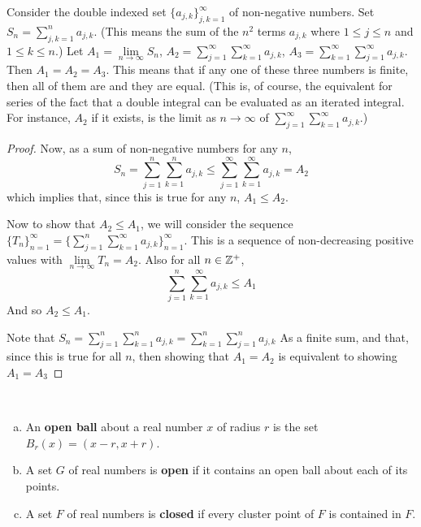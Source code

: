 \begin{pblm}%
	Consider the double indexed set $\{a_{j,k}\}_{j,k=1}^\infty$ of non-negative 
	numbers. Set $S_n = \sum\limits_{j,k=1}^na_{j,k}$. (This means the sum of the 
	$n^2$ terms $a_{j,k}$ where $1 \le j \le n$ and $1 \le k \le n$.) Let 
	$A_1 = \lim\limits_{n\to\infty}S_n$, 
	$A_2 = \sum\limits_{j=1}^\infty \sum\limits_{k=1}^\infty a_{j,k}$, 
	$A_3 = \sum\limits_{k=1}^\infty \sum\limits_{j=1}^\infty a_{j,k}$. 
	Then $A_1=A_2=A_3$. This means that if any 
	one of these three numbers is finite, then all of them are and they are 
	equal. (This is, of course, the equivalent for series of the fact that a 
	double integral can be evaluated as an iterated integral. For instance, $A_2$ 
	if it exists, is the limit as $n \to \infty$ of 
	$\sum\limits_{j=1}^\infty\sum\limits_{k=1}^\infty a_{j,k}$.)
\begin{proof}
	Now, as a sum of non-negative numbers for any $n$,
	\begin{equation*}
		S_n = \sum\limits_{j=1}^n\sum\limits_{k=1}^na_{j,k}\le
		\sum\limits_{j=1}^\infty\sum\limits_{k=1}^\infty a_{j,k}=A_2
	\end{equation*}
	which implies that, since this is true for any $n$, $A_1 \le A_2$. 

	Now to show that $A_2 \le A_1$, we will consider the sequence 
	$\{T_n\}_{n=1}^\infty = \{\sum\limits_{j=1}^n\sum\limits_{k=1}^\infty a_{j,k}\}_{n=1}^\infty$. This is a 
	sequence of non-decreasing positive values with $\lim\limits_{n\to\infty}T_n = A_2$. 
	Also for all $n \in \mathbb{Z}^+$, 
	\begin{equation*}
		\sum\limits_{j=1}^n\sum\limits_{k=1}^\infty a_{j,k} \le A_1
	\end{equation*}
	And so $A_2 \le A_1$. 

	Note that $S_n = \sum\limits_{j=1}^n\sum\limits_{k=1}^na_{j,k}=\sum\limits_{k=1}^n\sum\limits_{j=1}^na_{j,k}$
	As a finite sum, and that, since this is true for all $n$, then showing that $A_1 = A_2$ is equivalent to 
	showing $A_1 = A_3$

\end{proof}
\end{pblm}

\begin{defn}%
~
	\begin{enumerate}[(a)]
		\item An \textbf{open ball} about a real number $x$ of radius $r$ 
		is the set $B_r(x) = (x - r, x + r)$. 
		\item A set $G$ of real numbers is \textbf{open} if it contains an 
		open ball about each of its points. 
		\item A set $F$ of real numbers is \textbf{closed} if every cluster 
		point of $F$ is contained in $F$. 
	\end{enumerate}
\end{defn}

